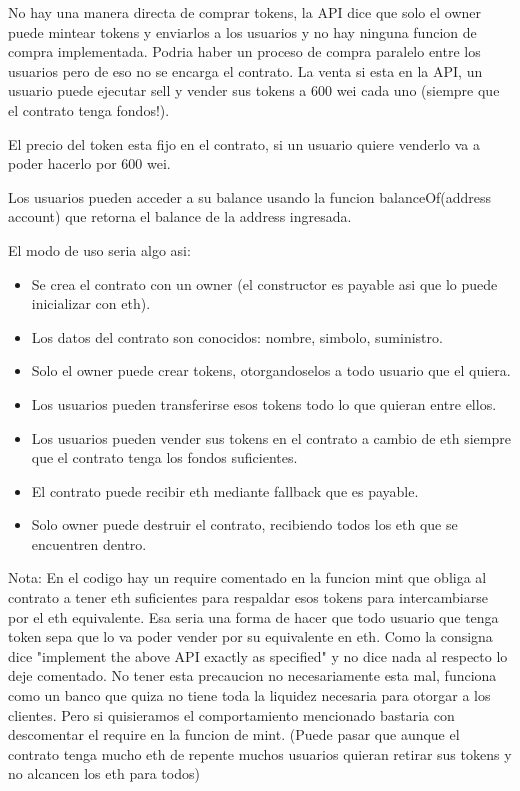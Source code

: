 \documentclass[12pt,addpoints,answers]{exam}
\begin{document}
\begin{questions}
\begin{parts}
\begin{solution}
            No hay una manera directa de comprar tokens, la API dice que solo el owner puede mintear tokens y enviarlos
            a los usuarios y no hay ninguna funcion de compra implementada. Podria haber un proceso de compra paralelo entre 
            los usuarios pero de eso no se encarga el contrato. La venta si esta en la API, un usuario puede ejecutar sell 
            y vender sus tokens a 600 wei cada uno (siempre que el contrato tenga fondos!).

            El precio del token esta fijo en el contrato, si un usuario quiere venderlo va a poder hacerlo por 600 wei.

            Los usuarios pueden acceder a su balance usando la funcion balanceOf(address account) que retorna el balance
            de la address ingresada.
            
            
            El modo de uso seria algo asi: 
            \begin{itemize}
                \item{Se crea el contrato con un owner (el constructor es payable asi que lo puede inicializar con eth).}
                \item{Los datos del contrato son conocidos: nombre, simbolo, suministro.}
                \item{Solo el owner puede crear tokens, otorgandoselos a todo usuario que el quiera.}
                \item{Los usuarios pueden transferirse esos tokens todo lo que quieran entre ellos.}
                \item{Los usuarios pueden vender sus tokens en el contrato 
                a cambio de eth siempre que el contrato tenga los fondos suficientes.}
                \item{El contrato puede recibir eth mediante fallback que es payable.}
                \item{Solo owner puede destruir el contrato, recibiendo todos los eth que se encuentren dentro.}
            \end{itemize}

            Nota: En el codigo hay un require comentado en la funcion mint que obliga al contrato a tener eth suficientes
            para respaldar esos tokens para intercambiarse por el eth equivalente. Esa seria una forma de hacer que 
            todo usuario que tenga token sepa que lo va poder vender por su equivalente en eth. Como la consigna
            dice "implement the above API exactly as specified" y no dice nada al respecto lo deje comentado. 
            No tener esta precaucion no necesariamente esta mal, funciona como un banco que quiza no tiene toda la liquidez necesaria
            para otorgar a los clientes. Pero si quisieramos el comportamiento mencionado bastaria con descomentar 
            el require en la funcion de mint. (Puede pasar que aunque el contrato tenga mucho eth de repente muchos
            usuarios quieran retirar sus tokens y no alcancen los eth para todos)
    \end{solution}


\end{parts}
\end{questions}
\end{document}
